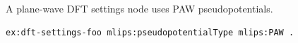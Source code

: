 A plane-wave DFT settings node uses PAW pseudopotentials.
\begin{lstlisting}[language=turtle]
ex:dft-settings-foo mlips:pseudopotentialType mlips:PAW .
\end{lstlisting}
